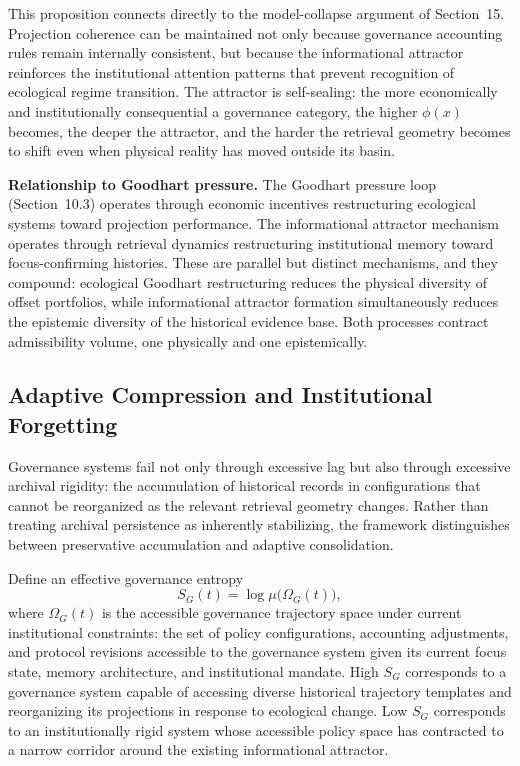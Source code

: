 \documentclass[12pt]{article}
\begin{document}
This proposition connects directly to the model-collapse argument of Section~15. Projection
coherence can be maintained not only because governance accounting rules remain internally
consistent, but because the informational attractor reinforces the institutional attention
patterns that prevent recognition of ecological regime transition. The attractor is
self-sealing: the more economically and institutionally consequential a governance
category, the higher $\phi(x)$ becomes, the deeper the attractor, and the harder the
retrieval geometry becomes to shift even when physical reality has moved outside its
basin.

\textbf{Relationship to Goodhart pressure.} The Goodhart pressure loop (Section~10.3)
operates through economic incentives restructuring ecological systems toward projection
performance. The informational attractor mechanism operates through retrieval dynamics
restructuring institutional memory toward focus-confirming histories. These are parallel
but distinct mechanisms, and they compound: ecological Goodhart restructuring reduces the
physical diversity of offset portfolios, while informational attractor formation
simultaneously reduces the epistemic diversity of the historical evidence base. Both
processes contract admissibility volume, one physically and one epistemically.

\subsection{Adaptive Compression and Institutional Forgetting}

Governance systems fail not only through excessive lag but also through excessive
archival rigidity: the accumulation of historical records in configurations that cannot
be reorganized as the relevant retrieval geometry changes. Rather than treating archival
persistence as inherently stabilizing, the framework distinguishes between preservative
accumulation and adaptive consolidation.

Define an effective governance entropy
\begin{equation}
\label{eq:gov-entropy}
S_G(t) = \log\mu\bigl(\Omega_G(t)\bigr),
\end{equation}
where $\Omega_G(t)$ is the accessible governance trajectory space under current
institutional constraints: the set of policy configurations, accounting adjustments, and
protocol revisions accessible to the governance system given its current focus state,
memory architecture, and institutional mandate. High $S_G$ corresponds to a governance
system capable of accessing diverse historical trajectory templates and reorganizing its
projections in response to ecological change. Low $S_G$ corresponds to an institutionally
rigid system whose accessible policy space has contracted to a narrow corridor around the
existing informational attractor.
\end{document}
